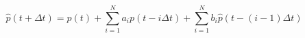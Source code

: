 \begin{equation}
	\hat{p}(t+\Delta t) = p(t) + \sum_{i=1}^{N} a_i p(t-i\Delta t)+ \sum_{i=1}^{N} b_i \hat{p}(t-(i-1)\Delta t)
\label{ch2:equ:mpc-arx}
\end{equation}